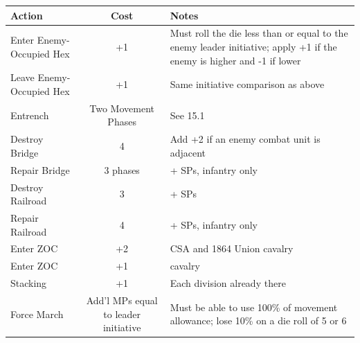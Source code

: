 \vspace{0.4em}
\begin{center}
\scriptsize
\begin{tabularx}{0.95\textwidth}{>{\raggedright\arraybackslash}p{}c>{\raggedright\arraybackslash}X}
\toprule
\textbf{Action} & \textbf{Cost} & \textbf{Notes} \\
\midrule
Enter Enemy-Occupied Hex & +1 & Must roll the die less than or equal to the enemy leader initiative; apply +1 if the enemy is higher and -1 if lower \\
Leave Enemy-Occupied Hex & +1 & Same initiative comparison as above \\
Entrench & Two Movement Phases & See 15.1 \\
Destroy Bridge & 4 & Add +2 if an enemy combat unit is adjacent \\
Repair Bridge & 3 phases & 5+ SPs, infantry only \\
Destroy Railroad & 3 & 5+ SPs \\
Repair Railroad & 4 & 5+ SPs, infantry only \\
Enter ZOC & +2 & CSA and 1864 Union cavalry \\
Enter ZOC & +1 & 1862 cavalry \\
Stacking & +1 & Each division already there \\
Force March & Add'l MPs equal to leader initiative & Must be able to use 100\% of movement allowance; lose 10\% on a die roll of 5 or 6 \\
\bottomrule
\end{tabularx}
\end{center}

\vspace{1em}

